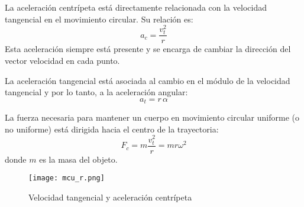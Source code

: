 \begin{tcolorbox}[remember, title=Aceleración centrípeta (\(a_c\))]
La aceleración centrípeta está directamente relacionada con la velocidad tangencial en el movimiento circular. Su relación es:
\[
a_c = \frac{v_t^2}{r}
\]
Esta aceleración siempre está presente y se encarga de cambiar la dirección del vector velocidad en cada punto.
\end{tcolorbox}

\begin{tcolorbox}[remember, title=Aceleración tangencial (\(a_t\))]
La aceleración tangencial está asociada al cambio en el módulo de la velocidad tangencial y por lo tanto, a la aceleración angular:
\[
a_t = r \, \alpha
\]
\end{tcolorbox}

\begin{tcolorbox}[remember, title=Fuerza centrípeta (\(F_c\))]
La fuerza necesaria para mantener un cuerpo en movimiento circular uniforme (o no uniforme) está dirigida hacia el centro de la trayectoria:
\[
F_c = m \frac{v_t^2}{r} = m r \omega^2
\]
donde \( m \) es la masa del objeto.
\end{tcolorbox}

\begin{figure}[ht]
  \centering
  \texttt{[image: mcu\_r.png]}
  \caption{Velocidad tangencial y aceleración centrípeta}
\end{figure}